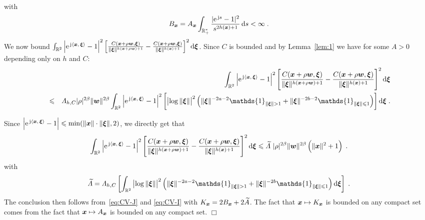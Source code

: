 \documentclass{elsarticle}
\newenvironment{proof}{\medskip\noindent{\bf Proof.}\;}{\null\hfill $\Box$\par\medskip }
\begin{document}
\begin{proof}
\begin{equation}
\end{equation}
with
\[
B_{\vect{x}}=A_{\vect{x}}\int_{\mathbb{R}_+^*}\frac{|\expj{s}-1|^2}{{s^{2h(\vect{x})+1}}}\dif s<\infty\;.
\]
We now bound $\int_{\mathbb{R}^2}\left|\expj{\ip{\vect{x}}{\vect{\xi}}}-1\right|^2\left[\frac{C(\vect{x}+\rho \vect{w},\vect{\xi})}{\lVert \vect{\xi} \rVert^{h(\vect{x}+\rho \vect{w})+1}}-\frac{C(\vect{x}+\rho \vect{w},\vect{\xi})}{\lVert \vect{\xi} \rVert^{h(\vect{x})+1}}\right]^2\dif\vect{\xi}$. Since $C$ is bounded and by Lemma~\ref{lem:1} we have for some $A>0$ depending only on $h$ and $C$:
\begin{eqnarray*}
&&\int_{\mathbb{R}^2}\left|\expj{\ip{\vect{x}}{\vect{\xi}}}-1\right|^2\left[\frac{C(\vect{x}+\rho \vect{w},\vect{\xi})}{\lVert \vect{\xi} \rVert^{h(\vect{x}+\rho \vect{w})+1}}-\frac{C(\vect{x}+\rho \vect{w},\vect{\xi})}{\lVert \vect{\xi} \rVert^{h(\vect{x})+1}}\right]^2\dif\vect{\xi}\\
&\leq & \Lambda_{h,C} |\rho|^{2\beta}\|\vect{w}\|^{2\beta} \int_{\mathbb{R}^2}\left|\expj{\ip{\vect{x}}{\vect{\xi}}}-1\right|^2 \left[\left|\log\|\vect{\xi}\|\right|^2\left(\|\vect{\xi}\|^{-2a-2}\mathds{1}_{\|\vect{\xi}\|>1}+\|\vect{\xi}\|^{-2b-2}\mathds{1}_{\|\vect{\xi}\|\leq 1}\right)\right]\dif\vect{\xi}\;.
\end{eqnarray*}

Since $\left|\mathrm{e}^{\, \mathrm{j} \left \langle \bm{x},\, \bm{\xi}\right \rangle}-1\right|\leqslant \min (\|\bm{x}\|\cdot\|\bm{\xi}\|,2)$, we directly get that
\begin{equation}
\label{eq:CV-I}
\int_{\mathbb{R}^2}\left|\expj{\ip{\vect{x}}{\vect{\xi}}}-1\right|^2\left[\frac{C(\vect{x}+\rho \vect{w},\vect{\xi})}{\lVert \vect{\xi} \rVert^{h(\vect{x}+\rho \vect{w})+1}}-\frac{C(\vect{x}+\rho \vect{w},\vect{\xi})}{\lVert \vect{\xi} \rVert^{h(\vect{x})+1}}\right]^2\dif\vect{\xi}\leq \widetilde{\Lambda}~ |\rho|^{2\beta}\|\vect{w}\|^{2\beta}\left(\|\vect{x}\|^2+1\right)\;.
\end{equation}
with
\[
\widetilde{\Lambda}=\Lambda_{h,C}\left[\int_{\mathbb{R}^2} \left|\log\|\vect{\xi}\|\right|^2\left(\|\vect{\xi}\|^{-2a-2}\mathds{1}_{\|\vect{\xi}\|>1}+\|\vect{\xi}\|^{-2b}\mathds{1}_{\|\vect{\xi}\|\leq 1}\right)\dif\vect{\xi}\right]\;.
\]
The conclusion then follows from~\eqref{eq:CV-J} and \eqref{eq:CV-I} with $K_{\bm{x}}=2B_{\bm{x}}+2\widetilde{A}$. The fact that $\bm{x}\mapsto K_{\bm{x}}$ is bounded on any compact set comes from the fact that $\bm{x}\mapsto A_{\bm{x}}$ is bounded on any compact set.
\end{proof}
\end{document}
